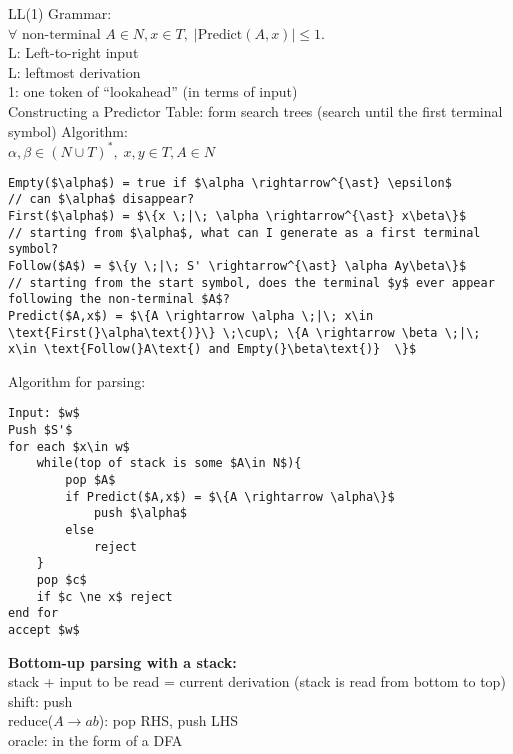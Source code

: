 \documentclass[12pt]{article}
\begin{document}
\noindent
LL(1) Grammar:\\
$\forall \text{ non-terminal } A \in N, x \in T, \; |\text{Predict}(A, x)| \leq 1$.\\
L: Left-to-right input\\
L: leftmost derivation\\
1: one token of ``lookahead'' (in terms of input)\\

\noindent
Constructing a Predictor Table: form search trees (search until the first terminal symbol)
Algorithm:\\
$\alpha, \beta \in (N \cup T)^{\ast}, \; x, y \in T, A\in N$
\begin{lstlisting}[mathescape=true, showstringspaces=false]
Empty($\alpha$) = true if $\alpha \rightarrow^{\ast} \epsilon$ 
// can $\alpha$ disappear?
First($\alpha$) = $\{x \;|\; \alpha \rightarrow^{\ast} x\beta\}$ 
// starting from $\alpha$, what can I generate as a first terminal symbol? 
Follow($A$) = $\{y \;|\; S' \rightarrow^{\ast} \alpha Ay\beta\}$ 
// starting from the start symbol, does the terminal $y$ ever appear following the non-terminal $A$?
Predict($A,x$) = $\{A \rightarrow \alpha \;|\; x\in \text{First(}\alpha\text{)}\} \;\cup\; \{A \rightarrow \beta \;|\; x\in \text{Follow(}A\text{) and Empty(}\beta\text{)}  \}$
\end{lstlisting}

\noindent
Algorithm for parsing:
\begin{lstlisting}[mathescape=true, showstringspaces=false]
Input: $w$
Push $S'$
for each $x\in w$
	while(top of stack is some $A\in N$){
		pop $A$
		if Predict($A,x$) = $\{A \rightarrow \alpha\}$
			push $\alpha$
		else
		    reject	
	}
	pop $c$
	if $c \ne x$ reject
end for
accept $w$
\end{lstlisting}
\noindent
\textbf{Bottom-up parsing with a stack:}\\
stack + input to be read = current derivation (stack is read from bottom to top)\\
shift: push\\
reduce($A\rightarrow ab$): pop RHS, push LHS\\
oracle: in the form of a DFA\\
\end{document}
